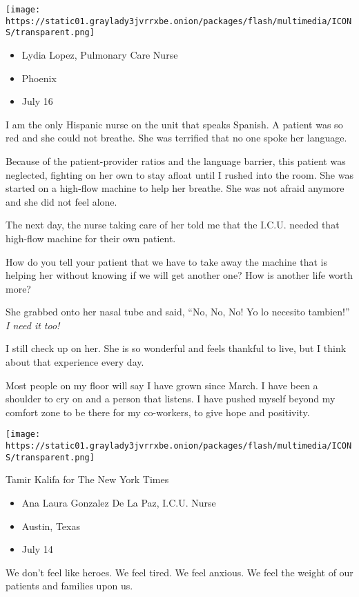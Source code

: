 \texttt{[image: https://static01.graylady3jvrrxbe.onion/packages/flash/multimedia/ICONS/transparent.png]}

\begin{itemize}
\tightlist
\item
  Lydia Lopez, Pulmonary Care Nurse
\item
  Phoenix
\item
  July 16
\end{itemize}

I am the only Hispanic nurse on the unit that speaks Spanish. A patient
was so red and she could not breathe. She was terrified that no one
spoke her language.

Because of the patient-provider ratios and the language barrier, this
patient was neglected, fighting on her own to stay afloat until I rushed
into the room. She was started on a high-flow machine to help her
breathe. She was not afraid anymore and she did not feel alone.

The next day, the nurse taking care of her told me that the I.C.U.
needed that high-flow machine for their own patient.

How do you tell your patient that we have to take away the machine that
is helping her without knowing if we will get another one? How is
another life worth more?

She grabbed onto her nasal tube and said, ``No, No, No! Yo lo necesito
tambien!'' \emph{I need it too!}

I still check up on her. She is so wonderful and feels thankful to live,
but I think about that experience every day.

Most people on my floor will say I have grown since March. I have been a
shoulder to cry on and a person that listens. I have pushed myself
beyond my comfort zone to be there for my co-workers, to give hope and
positivity.

\texttt{[image: https://static01.graylady3jvrrxbe.onion/packages/flash/multimedia/ICONS/transparent.png]}

Tamir Kalifa for The New York Times

\begin{itemize}
\tightlist
\item
  Ana Laura Gonzalez De La Paz, I.C.U. Nurse
\item
  Austin, Texas
\item
  July 14
\end{itemize}

We don't feel like heroes. We feel tired. We feel anxious. We feel the
weight of our patients and families upon us.


